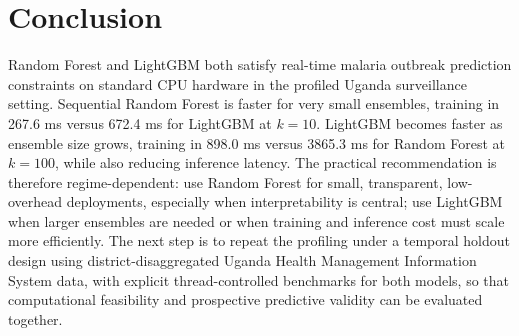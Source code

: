 \documentclass[11pt]{article}
\begin{document}
\section{Conclusion}
Random Forest and LightGBM both satisfy real-time malaria outbreak prediction constraints on standard CPU hardware in the profiled Uganda surveillance setting. Sequential Random Forest is faster for very small ensembles, training in 267.6 ms versus 672.4 ms for LightGBM at $k=10$. LightGBM becomes faster as ensemble size grows, training in 898.0 ms versus 3865.3 ms for Random Forest at $k=100$, while also reducing inference latency. The practical recommendation is therefore regime-dependent: use Random Forest for small, transparent, low-overhead deployments, especially when interpretability is central; use LightGBM when larger ensembles are needed or when training and inference cost must scale more efficiently. The next step is to repeat the profiling under a temporal holdout design using district-disaggregated Uganda Health Management Information System data, with explicit thread-controlled benchmarks for both models, so that computational feasibility and prospective predictive validity can be evaluated together.



\end{document}
